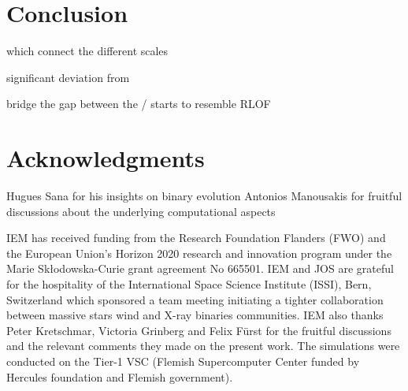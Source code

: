 \documentclass[a4paper,fleqn,usenatbib]{mnras}
\begin{document}
\section{Conclusion}
\label{sec:conc}

which connect the different scales 

significant deviation from 

bridge the gap between the  / starts to resemble RLOF


\section*{Acknowledgments}


Hugues Sana for his insights on binary evolution
Antonios Manousakis for fruitful discussions about the underlying computational aspects

IEM has received funding from the Research Foundation Flanders (FWO) and the European Union's Horizon 2020 research and innovation program under the Marie Sk\l odowska-Curie grant agreement No 665501. IEM and JOS are grateful for the hospitality of the International Space Science Institute (ISSI), Bern, Switzerland which sponsored a team meeting initiating a tighter collaboration between massive stars wind and X-ray binaries communities. IEM also thanks Peter Kretschmar, Victoria Grinberg and Felix F\"urst for the fruitful discussions and the relevant comments they made on the present work. The simulations were conducted on the Tier-1 VSC (Flemish Supercomputer Center funded by Hercules foundation and Flemish government).





\begin{tiny}

\end{tiny}



\bsp	%
\label{lastpage}
\end{document}
